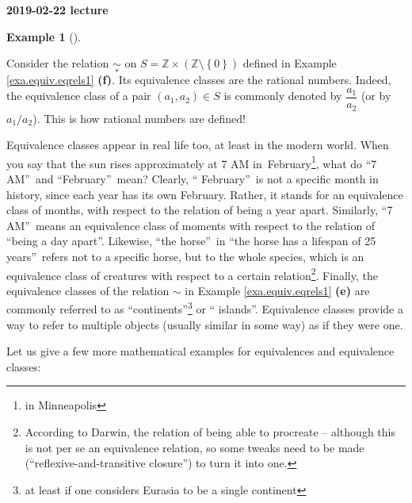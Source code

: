 \documentclass[numbers=enddot,12pt,final,onecolumn,notitlepage]{scrartcl}%
\numberwithin{exer}{subsection}
\theoremstyle{definition}
\newtheorem{exam}[theo]{Example}
\newenvironment{example}[1][]
{\begin{exam}[#1]\begin{leftbar}}
{\end{leftbar}\end{exam}}
\begin{document}
\begin{center}
\textbf{2019-02-22 lecture}
\end{center}

\begin{example}
Consider the relation $\underset{\ast}{\sim}$ on $S=\mathbb{Z}\times\left(
\mathbb{Z}\setminus\left\{  0\right\}  \right)  $ defined in Example
\ref{exa.equiv.eqrels1} \textbf{(f)}. Its equivalence classes are the rational
numbers. Indeed, the equivalence class of a pair $\left(  a_{1},a_{2}\right)
\in S$ is commonly denoted by $\dfrac{a_{1}}{a_{2}}$ (or by $a_{1}/a_{2}$).
This is how rational numbers are defined!
\end{example}

Equivalence classes appear in real life too, at least in the modern world.
When you say that the sun rises approximately at 7 AM in\ February\footnote{in
Minneapolis}, what do \textquotedblleft7 AM\textquotedblright\ and
\textquotedblleft February\textquotedblright\ mean? Clearly, \textquotedblleft
February\textquotedblright\ is not a specific month in history, since each
year has its own February. Rather, it stands for an equivalence class of
months, with respect to the relation of being a year apart. Similarly,
\textquotedblleft7 AM\textquotedblright\ means an equivalence class of moments
with respect to the relation of \textquotedblleft being a day
apart\textquotedblright. Likewise, \textquotedblleft the
horse\textquotedblright\ in \textquotedblleft the horse has a lifespan of 25
years\textquotedblright\ refers not to a specific horse, but to the whole
species, which is an equivalence class of creatures with respect to a certain
relation\footnote{According to Darwin, the relation of being able to procreate
-- although this is not per se an equivalence relation, so some tweaks need to
be made (\textquotedblleft reflexive-and-transitive closure\textquotedblright)
to turn it into one.}. Finally, the equivalence classes of the relation $\sim$
in Example \ref{exa.equiv.eqrels1} \textbf{(e)} are commonly referred to as
\textquotedblleft continents\textquotedblright\footnote{at least if one
considers Eurasia to be a single continent} or \textquotedblleft
islands\textquotedblright. Equivalence classes provide a way to refer to
multiple objects (usually similar in some way) as if they were one.

Let us give a few more mathematical examples for equivalences and equivalence classes:
\end{document}
